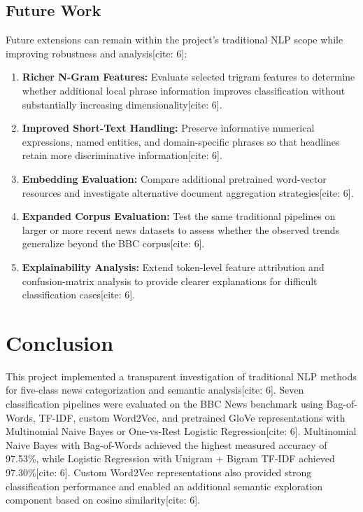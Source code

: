 \documentclass[11pt,a4paper]{article}
\begin{document}
	\subsection{Future Work}
	Future extensions can remain within the project's traditional NLP scope while improving robustness and analysis[cite: 6]:
	
	\begin{enumerate}[leftmargin=1.5em, itemsep=0.2em]
		\item \textbf{Richer N-Gram Features:} Evaluate selected trigram features to determine whether additional local phrase information improves classification without substantially increasing dimensionality[cite: 6].
		\item \textbf{Improved Short-Text Handling:} Preserve informative numerical expressions, named entities, and domain-specific phrases so that headlines retain more discriminative information[cite: 6].
		\item \textbf{Embedding Evaluation:} Compare additional pretrained word-vector resources and investigate alternative document aggregation strategies[cite: 6].
		\item \textbf{Expanded Corpus Evaluation:} Test the same traditional pipelines on larger or more recent news datasets to assess whether the observed trends generalize beyond the BBC corpus[cite: 6].
		\item \textbf{Explainability Analysis:} Extend token-level feature attribution and confusion-matrix analysis to provide clearer explanations for difficult classification cases[cite: 6].
	\end{enumerate}
	
	\section{Conclusion}
	\label{sec:conclusion}
	
	This project implemented a transparent investigation of traditional NLP methods for five-class news categorization and semantic analysis[cite: 6]. Seven classification pipelines were evaluated on the BBC News benchmark using Bag-of-Words, TF-IDF, custom Word2Vec, and pretrained GloVe representations with Multinomial Naive Bayes or One-vs-Rest Logistic Regression[cite: 6]. Multinomial Naive Bayes with Bag-of-Words achieved the highest measured accuracy of 97.53\%, while Logistic Regression with Unigram + Bigram TF-IDF achieved 97.30\%[cite: 6]. Custom Word2Vec representations also provided strong classification performance and enabled an additional semantic exploration component based on cosine similarity[cite: 6].
	
\end{document}
